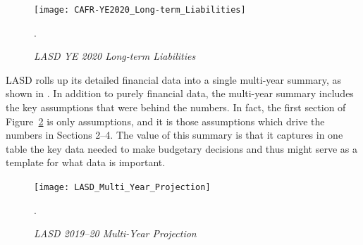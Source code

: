 \begin{figure}
  \centering
  \caption[LASD YE 2020 Long-term Liabilities]{\textit{LASD YE 2020 Long-term Liabilities}}%
  \label{fig:Long-term_Liabilities}
  \texttt{[image: CAFR-YE2020\_Long-term\_Liabilities]}\\
  \footnotesize\raggedright\textcite[11]{Kenyon2021}.
\end{figure}%

LASD rolls up its detailed financial data into a single multi-year summary, as shown in . In addition to purely financial data, the multi-year summary includes the key
assumptions that were behind the numbers. In fact, the first section of Figure~\ref{fig:multi-year-proj} is only assumptions, and it is those assumptions which drive the numbers in Sections 2–4. The value of this summary is that it captures in one table the key data needed to make budgetary decisions and thus might serve as a template for what data is important. 

\begin{figure}[!t]
  \centering
  \caption[LASD 2019–20 Multi-Year Projection]{\textit{LASD 2019–20 Multi-Year Projection}}%
  \label{fig:multi-year-proj}
  \texttt{[image: LASD\_Multi\_Year\_Projection]}\
  \footnotesize\raggedright\textcite[137]{Kenyon2021a}.
\end{figure}\bigskip%


